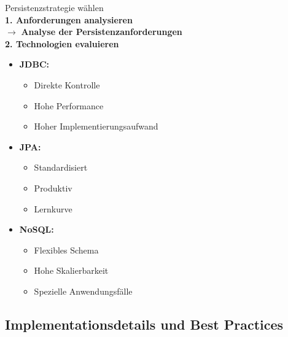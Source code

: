 \begin{KR}{Persistenzstrategie wählen}\\
\textbf{1. Anforderungen analysieren} \\
$\rightarrow$ \textcolor{frog}{\textbf{Analyse der Persistenzanforderungen}}\\

\textbf{2. Technologien evaluieren}
\begin{itemize}
    \item \textbf{JDBC:}
    \begin{itemize}
        \item Direkte Kontrolle
        \item Hohe Performance
        \item Hoher Implementierungsaufwand
    \end{itemize}
    \item \textbf{JPA:}
    \begin{itemize}
        \item Standardisiert
        \item Produktiv
        \item Lernkurve
    \end{itemize}
    \item \textbf{NoSQL:}
    \begin{itemize}
        \item Flexibles Schema
        \item Hohe Skalierbarkeit
        \item Spezielle Anwendungsfälle
    \end{itemize}
\end{itemize}
\end{KR}





\subsection{Implementationsdetails und Best Practices}

